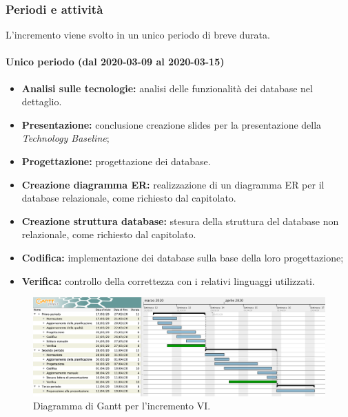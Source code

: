 			\subsubsection{Periodi e attività}
			
				L'incremento viene svolto in un unico periodo di breve durata.
				
				\paragraph{Unico periodo (dal 2020-03-09 al 2020-03-15)}
				
					\begin{itemize}
						\item \textbf{Analisi sulle tecnologie:} analisi delle funzionalità dei database nel dettaglio.
						\item \textbf{Presentazione:} conclusione creazione slides per la presentazione della \textit{Technology Baseline};
						\item \textbf{Progettazione:} progettazione dei database.
						\item \textbf{Creazione diagramma ER:} realizzazione di un diagramma ER per il database relazionale, come richiesto dal capitolato.
						\item \textbf{Creazione struttura database:} stesura della struttura del database non relazionale, come richiesto dal capitolato.
						\item \textbf{Codifica:} implementazione dei database sulla base della loro progettazione;
						\item \textbf{Verifica:} controllo della correttezza con i relativi linguaggi utilizzati.
					\end{itemize} 			

		\begin{landscape}
          \begin{figure}[H]
            \centering
            \includegraphics[width=\linewidth]{images/ganttDettaglioCodifica} %
            \caption{Diagramma di Gantt per l'incremento VI.}
          \end{figure}		
		\end{landscape}

